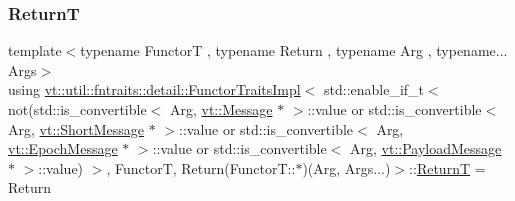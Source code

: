 \subsubsection{\texorpdfstring{ReturnT}{ReturnT}}
{\footnotesize\ttfamily template$<$typename FunctorT , typename Return , typename Arg , typename... Args$>$ \\
using \hyperlink{structvt_1_1util_1_1fntraits_1_1detail_1_1_functor_traits_impl}{vt\+::util\+::fntraits\+::detail\+::\+Functor\+Traits\+Impl}$<$ std\+::enable\+\_\+if\+\_\+t$<$ not(std\+::is\+\_\+convertible$<$ Arg, \hyperlink{namespacevt_a3a3ddfef40b4c90915fa43cdd5f129ea}{vt\+::\+Message} $\ast$ $>$\+::value or std\+::is\+\_\+convertible$<$ Arg, \hyperlink{namespacevt_a1125ac1da6c0bbf141e0ea0739d7602d}{vt\+::\+Short\+Message} $\ast$ $>$\+::value or std\+::is\+\_\+convertible$<$ Arg, \hyperlink{namespacevt_ad67368ffae52d7325002586b41bb150e}{vt\+::\+Epoch\+Message} $\ast$ $>$\+::value or std\+::is\+\_\+convertible$<$ Arg, \hyperlink{namespacevt_a89a92229c5622b855c02c549f83a1a68}{vt\+::\+Payload\+Message} $\ast$ $>$\+::value) $>$, FunctorT, Return(Functor\+T\+::$\ast$)(Arg, Args...)$>$\+::\hyperlink{structvt_1_1util_1_1fntraits_1_1detail_1_1_functor_traits_impl_3_01std_1_1enable__if__t_3_01not_ff7bf429a58012799da4cee5038d568d_a4ab930f609baf97c0a23ed9fd273f322}{ReturnT} =  Return}

